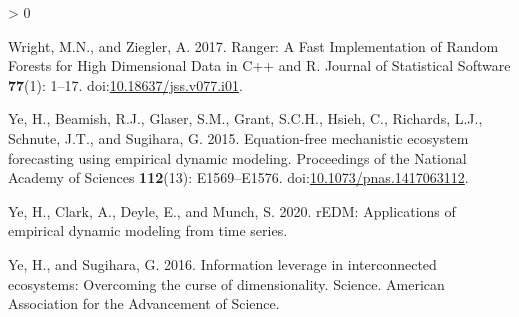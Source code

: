 \documentclass[
]{article}
\newlength{\cslhangindent}
\newenvironment{CSLReferences}[2] %
 {%
  \setlength{\parindent}{0pt}
  \ifodd #1 \everypar{\setlength{\hangindent}{\cslhangindent}}\ignorespaces\fi
  \ifnum #2 > 0
  \setlength{\parskip}{#2\baselineskip}
  \fi
 }%
 {}
\begin{document}
\begin{CSLReferences}{1}{0}
\leavevmode\hypertarget{ref-wright2017}{}%
Wright, M.N., and Ziegler, A. 2017. Ranger: {A Fast Implementation} of {Random Forests} for {High Dimensional Data} in {C}++ and {R}. Journal of Statistical Software \textbf{77}(1): 1--17. doi:\href{https://doi.org/10.18637/jss.v077.i01}{10.18637/jss.v077.i01}.

\leavevmode\hypertarget{ref-ye2015}{}%
Ye, H., Beamish, R.J., Glaser, S.M., Grant, S.C.H., Hsieh, C., Richards, L.J., Schnute, J.T., and Sugihara, G. 2015. Equation-free mechanistic ecosystem forecasting using empirical dynamic modeling. Proceedings of the National Academy of Sciences \textbf{112}(13): E1569--E1576. doi:\href{https://doi.org/10.1073/pnas.1417063112}{10.1073/pnas.1417063112}.

\leavevmode\hypertarget{ref-ye2020}{}%
Ye, H., Clark, A., Deyle, E., and Munch, S. 2020. rEDM: Applications of empirical dynamic modeling from time series.

\leavevmode\hypertarget{ref-ye2016}{}%
Ye, H., and Sugihara, G. 2016. Information leverage in interconnected ecosystems: {Overcoming} the curse of dimensionality. Science. {American Association for the Advancement of Science}.

\end{CSLReferences}
\end{document}
